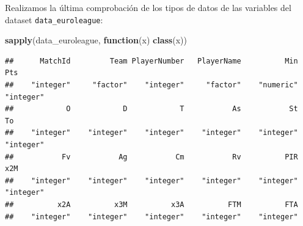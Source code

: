 \documentclass[
]{article}
\newenvironment{Shaded}{\begin{snugshade}}{\end{snugshade}}
\newcommand{\CommentTok}[1]{\textcolor[rgb]{0.56,0.35,0.01}{\textit{#1}}}
\newcommand{\ControlFlowTok}[1]{\textcolor[rgb]{0.13,0.29,0.53}{\textbf{#1}}}
\newcommand{\DecValTok}[1]{\textcolor[rgb]{0.00,0.00,0.81}{#1}}
\newcommand{\KeywordTok}[1]{\textcolor[rgb]{0.13,0.29,0.53}{\textbf{#1}}}
\newcommand{\NormalTok}[1]{#1}
\newcommand{\OperatorTok}[1]{\textcolor[rgb]{0.81,0.36,0.00}{\textbf{#1}}}
\newcommand{\OtherTok}[1]{\textcolor[rgb]{0.56,0.35,0.01}{#1}}
\newcommand{\StringTok}[1]{\textcolor[rgb]{0.31,0.60,0.02}{#1}}
\begin{document}
\begin{Shaded}
\end{Shaded}

Realizamos la última comprobación de los tipos de datos de las variables
del dataset \texttt{data\_euroleague}:

\begin{Shaded}
\begin{Highlighting}[]
\KeywordTok{sapply}\NormalTok{(data_euroleague, }\ControlFlowTok{function}\NormalTok{(x) }\KeywordTok{class}\NormalTok{(x))}
\end{Highlighting}
\end{Shaded}

\begin{verbatim}
##      MatchId         Team PlayerNumber   PlayerName          Min          Pts 
##    "integer"     "factor"    "integer"     "factor"    "numeric"    "integer" 
##            O            D            T           As           St           To 
##    "integer"    "integer"    "integer"    "integer"    "integer"    "integer" 
##           Fv           Ag           Cm           Rv          PIR          x2M 
##    "integer"    "integer"    "integer"    "integer"    "integer"    "integer" 
##          x2A          x3M          x3A          FTM          FTA 
##    "integer"    "integer"    "integer"    "integer"    "integer"
\end{verbatim}
\end{document}

